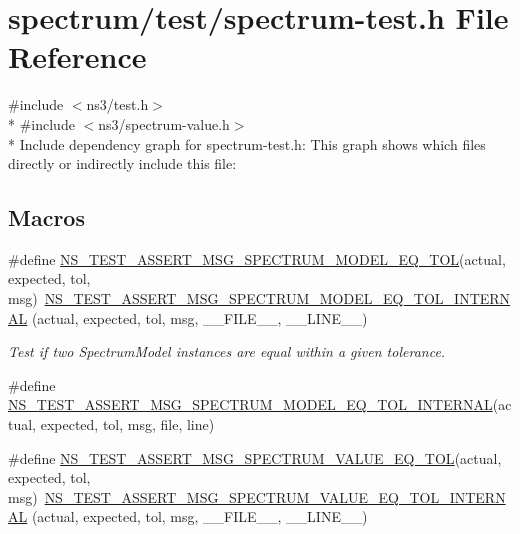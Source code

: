 \hypertarget{spectrum-test_8h}{}\section{spectrum/test/spectrum-\/test.h File Reference}
\label{spectrum-test_8h}
{\ttfamily \#include $<$ns3/test.\+h$>$}\\*
{\ttfamily \#include $<$ns3/spectrum-\/value.\+h$>$}\\*
Include dependency graph for spectrum-\/test.h\+:
This graph shows which files directly or indirectly include this file\+:
\subsection*{Macros}
\begin{DoxyCompactItemize}
\item 
\#define \hyperlink{spectrum-test_8h_a50069f8ebd9506531d2a38dea92b6764}{N\+S\+\_\+\+T\+E\+S\+T\+\_\+\+A\+S\+S\+E\+R\+T\+\_\+\+M\+S\+G\+\_\+\+S\+P\+E\+C\+T\+R\+U\+M\+\_\+\+M\+O\+D\+E\+L\+\_\+\+E\+Q\+\_\+\+T\+OL}(actual,  expected,  tol,  msg)~\hyperlink{spectrum-test_8h_a47dc3be74401364cb86df3f0ce47ddb6}{N\+S\+\_\+\+T\+E\+S\+T\+\_\+\+A\+S\+S\+E\+R\+T\+\_\+\+M\+S\+G\+\_\+\+S\+P\+E\+C\+T\+R\+U\+M\+\_\+\+M\+O\+D\+E\+L\+\_\+\+E\+Q\+\_\+\+T\+O\+L\+\_\+\+I\+N\+T\+E\+R\+N\+AL} (actual, expected, tol, msg, \+\_\+\+\_\+\+F\+I\+L\+E\+\_\+\+\_\+, \+\_\+\+\_\+\+L\+I\+N\+E\+\_\+\+\_\+)
\begin{DoxyCompactList}\small\item\em Test if two Spectrum\+Model instances are equal within a given tolerance. \end{DoxyCompactList}\item 
\#define \hyperlink{spectrum-test_8h_a47dc3be74401364cb86df3f0ce47ddb6}{N\+S\+\_\+\+T\+E\+S\+T\+\_\+\+A\+S\+S\+E\+R\+T\+\_\+\+M\+S\+G\+\_\+\+S\+P\+E\+C\+T\+R\+U\+M\+\_\+\+M\+O\+D\+E\+L\+\_\+\+E\+Q\+\_\+\+T\+O\+L\+\_\+\+I\+N\+T\+E\+R\+N\+AL}(actual,  expected,  tol,  msg,  file,  line)
\item 
\#define \hyperlink{spectrum-test_8h_ac37d86c7027e04c671885b0f087ab7e0}{N\+S\+\_\+\+T\+E\+S\+T\+\_\+\+A\+S\+S\+E\+R\+T\+\_\+\+M\+S\+G\+\_\+\+S\+P\+E\+C\+T\+R\+U\+M\+\_\+\+V\+A\+L\+U\+E\+\_\+\+E\+Q\+\_\+\+T\+OL}(actual,  expected,  tol,  msg)~\hyperlink{spectrum-test_8h_ae45e887a768cbf5bc8164ff8bbee2808}{N\+S\+\_\+\+T\+E\+S\+T\+\_\+\+A\+S\+S\+E\+R\+T\+\_\+\+M\+S\+G\+\_\+\+S\+P\+E\+C\+T\+R\+U\+M\+\_\+\+V\+A\+L\+U\+E\+\_\+\+E\+Q\+\_\+\+T\+O\+L\+\_\+\+I\+N\+T\+E\+R\+N\+AL} (actual, expected, tol, msg, \+\_\+\+\_\+\+F\+I\+L\+E\+\_\+\+\_\+, \+\_\+\+\_\+\+L\+I\+N\+E\+\_\+\+\_\+)

\end{DoxyCompactItemize}
